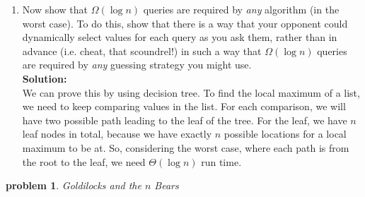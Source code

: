 \documentclass[10pt]{article}
\newtheorem{problem}{\sc\color{cit}problem}
\begin{document}
\begin{enumerate}
    \item Now show that $\Omega(\log n)$ queries are required by \emph{any} algorithm (in the worst case). To do this, show that there is a way that your opponent could dynamically select values for each query as you ask them, rather than in advance (i.e. cheat, that scoundrel!) in such a way that $\Omega(\log n)$ queries are required by \emph{any} guessing strategy you might use.\\
    \textbf{Solution:}\\
    We can prove this by using decision tree. To find the local maximum of a list, we need to keep comparing values in the list. For each comparison, we will have two possible path leading to the leaf of the tree. For the leaf, we have $n$ leaf nodes in total, because we have exactly $n$ possible locations for a local maximum to be at. So, considering the worst case, where each path is from the root to the leaf, we need $\Theta(\log n)$ run time. 
\end{enumerate}


\begin{problem} Goldilocks and the $n$ Bears \end{problem}
\end{document}
